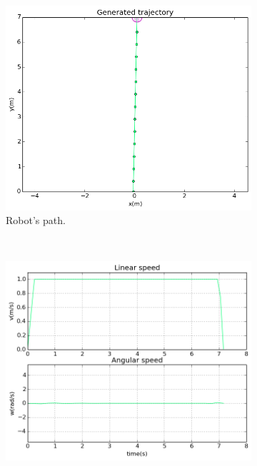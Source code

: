 \begin{figure}[!h]
        \centering
        ~ %
        \begin{subfigure}[b]{0.48\textwidth}
                \includegraphics[width=\textwidth]{./img/realtime/sim_results/p_0_0.4_2.0_9_5_0.001_15_40_20_5.0_0.1_3.0_0.5_1.0_10.0/multirobot-path.png}
                \caption{Robot's path.}\label{fig:sim0rpath}
        \end{subfigure}
        ~ %
        \begin{subfigure}[b]{0.48\textwidth}
		\includegraphics[width=\textwidth]{./img/realtime/sim_results/p_0_0.4_2.0_9_5_0.001_15_40_20_5.0_0.1_3.0_0.5_1.0_10.0/multirobot-vw.png}

\end{subfigure}
\end{figure}
